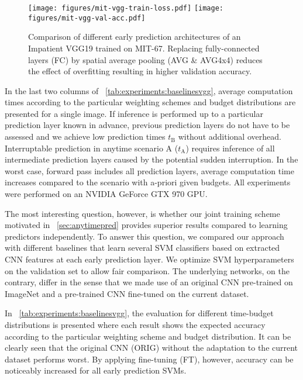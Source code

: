 \documentclass{bmvc2k}
\begin{document}
    \begin{figure}[t]
        \centering
        \texttt{[image: figures/mit-vgg-train-loss.pdf]} 
        \texttt{[image: figures/mit-vgg-val-acc.pdf]} 
        \caption{Comparison of different early prediction architectures of an Impatient VGG19 trained on MIT-67.
            Replacing fully-connected layers (FC) by spatial average pooling (AVG \& AVG4x4) reduces the effect of overfitting resulting in higher validation accuracy.
        }
        \label{fig:experiments:EPs}
    \end{figure}
    
    
    In the last two columns of \tablename~\ref{tab:experiments:baselinesvgg}, average computation times according to the particular weighting schemes and budget distributions are presented for a single image.
    If inference is performed up to a particular prediction layer known in advance, previous prediction layers do not have to be assessed
    and we achieve low prediction times $t_{\text{B}}$ without additional overhead.
    Interruptable prediction in anytime scenario A ($t_{\text{A}}$) requires inference of all intermediate prediction layers caused by the potential sudden interruption.
    In the worst case, \ie\the forward pass includes all prediction layers, average computation time increases compared to the 
    scenario with a-priori given budgets.
    All experiments were performed on an NVIDIA GeForce GTX 970 GPU.

    The most interesting question, however, is whether our joint training scheme motivated in \sectionname~\ref{sec:anytimepred} 
    provides superior results compared to learning predictors independently.
    To answer this question, we compared our approach with different baselines that learn several SVM classifiers based on extracted CNN features \cite{donahue2013decaf} at each early prediction layer.
    We optimize SVM hyperparameters on the validation set to allow fair comparison.
    The underlying networks, on the contrary, differ in the sense that we made use of an original CNN pre-trained on ImageNet and a pre-trained CNN fine-tuned on the current dataset.
    
    In \tablename~\ref{tab:experiments:baselinesvgg}, the evaluation for different time-budget distributions is presented where each result shows the expected
    accuracy according to the particular weighting scheme and budget distribution.
    It can be clearly seen that the original CNN (ORIG) without the adaptation to the current dataset performs worst.
    By applying fine-tuning (FT), however, accuracy can be noticeably increased for all early prediction SVMs.
    
\end{document}
